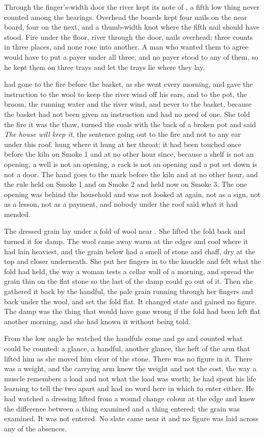 Through the finger's-width door the river kept its note of , a fifth low thing never counted among the hearings. Overhead the boards kept four nails on the near board, four on the next, and a thumb-width knot where the fifth nail should have stood. Fire under the floor, river through the door, nails overhead: three counts in three places, and none rose into another. A man who wanted them to agree would have to put a payer under all three, and no payer stood to any of them, so he kept them on three trays and let the trays lie where they lay.

 had gone to the fire before the basket, as she went every morning, and gave the instruction to the wool to keep the river wind off his ears, and to the pot, the broom, the running water and the river wind, and never to the basket, because the basket had not been given an instruction and had no need of one. She told the fire it was the thaw, turned the coals with the back of a broken pot and said \emph{The house will keep it}, the sentence going out to the fire and not to any ear under this roof.  hung where it hung at her throat; it had been touched once before the kiln on Smoke 1 and at no other hour since, because a shelf is not an opening, a well is not an opening, a rack is not an opening and a pot set down is not a door. The hand goes to the mark before the kiln and at no other hour, and the rule held on Smoke 1 and on Smoke 2 and held now on Smoke 3. The one opening was behind the household and was not looked at again, not as a sign, not as a lesson, not as a payment, and nobody under the roof said what it had mended.

The dressed grain lay under a fold of wool near . She lifted the fold back and turned it for damp. The wool came away warm at the edges and cool where it had lain heaviest, and the grain below had a smell of stone and chaff, dry at the top and closer underneath. She put her fingers in to the knuckle and felt what the fold had held, the way a woman tests a cellar wall of a morning, and spread the grain thin on the flat stone so the last of the damp could go out of it. Then she gathered it back by the handful, the pale grain running through her fingers and back under the wool, and set the fold flat. It changed state and gained no figure. The damp was the thing that would have gone wrong if the fold had been left flat another morning, and she had known it without being told.

From the low angle he watched the handfuls come and go and counted what could be counted: a glance, a handful, another glance, the heft of the arm that lifted him as she moved him clear of the stone. There was no figure in it. There was a weight, and the carrying arm knew the weight and not the cost, the way a muscle remembers a load and not what the load was worth; he had spent his life learning to tell the two apart and had no word here in which to enter either. He had watched a dressing lifted from a wound change colour at the edge and knew the difference between a thing examined and a thing entered; the grain was examined. It was not entered. No slate came near it and no figure was laid across any of the absences.

